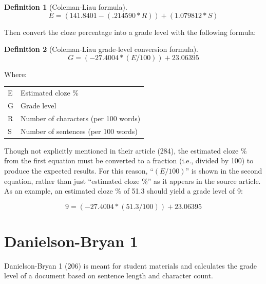 \documentclass[
]{book}
\theoremstyle{definition}
\newtheorem{definition}{Definition}[chapter]
\theoremstyle{definition}
\theoremstyle{definition}
\theoremstyle{definition}
\theoremstyle{remark}
\begin{document}
\begin{definition}[Coleman-Liau formula]
\protect\hypertarget{def:colemanliaucloze}{}{\label{def:colemanliaucloze} {} }\[
E = (141.8401 - (.214590*R)) + (1.079812*S)
\]
\end{definition}

Then convert the cloze percentage into a grade level with the following formula:

\begin{definition}[Coleman-Liau grade-level conversion formula]
\protect\hypertarget{def:colemanliaugrade}{}{\label{def:colemanliaugrade} {} }\[
G = (-27.4004*(E/100)) + 23.06395
\]
\end{definition}

Where:

\begin{longtable}[]{@{}
  >{\raggedright\arraybackslash}p{}
  >{\raggedright\arraybackslash}p{}@{}}
\toprule
\endhead
E & Estimated cloze \% \\
G & Grade level \\
R & Number of characters (per 100 words) \\
S & Number of sentences (per 100 words) \\
\bottomrule
\end{longtable}

Though not explicitly mentioned in their article (284), the estimated cloze \% from the first equation must be converted to a fraction (i.e., divided by 100) to produce the expected results. For this reason, ``\((E/100)\)'' is shown in the second equation, rather than just ``estimated cloze \%'' as it appears in the source article. As an example, an estimated cloze \% of 51.3 should yield a grade level of 9:

\[
9 = (-27.4004*(51.3/100)) + 23.06395
\]

\newpage

\hypertarget{danielson-bryan-1}{%
\section{\texorpdfstring{Danielson-Bryan 1}{Danielson-Bryan 1}}\label{danielson-bryan-1}}

Danielson-Bryan 1 (206) is meant for student materials and calculates the grade level of a document based on sentence length and character count.
\end{document}
